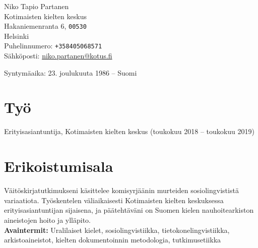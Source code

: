 \documentclass[11pt, a4paper]{article}
\begin{document}

{\LARGE Niko Tapio Partanen}\\[1cm] %
Kotimaisten kielten keskus\\
Hakaniemenranta 6, \texttt{00530}\\
Helsinki\\[.2cm]
Puhelinnumero: \texttt{+358405068571}\\ %
Sähköposti: \href{mailto:niko.partanen@kotus.fi}{niko.partanen@kotus.fi}\\ %

\vspace{10mm}

Syntymäaika: 23. joulukuuta 1986 – Suomi\\ %


\section*{Työ}

Erityisasiantuntija, Kotimaisten kielten keskus (toukokuu 2018 – toukokuu 2019) %

\section*{Erikoistumisala}

Väitöskirjatutkimukseni käsittelee komisyrjäänin murteiden sosiolingvististä variaatiota. Työskentelen väliaikaisesti Kotimaisten kielten keskuksessa erityisasiantuntijan sijaisena, ja päätehtäväni on Suomen kielen nauhoitearkiston aineistojen hoito ja ylläpito.\\

\textbf{Avaintermit:} Uralilaiset kielet, sosiolingvistiikka, tietokonelingvistiikka, arkistoaineistot, kielten dokumentoinnin metodologia, tutkimusetiikka %

\end{document}
